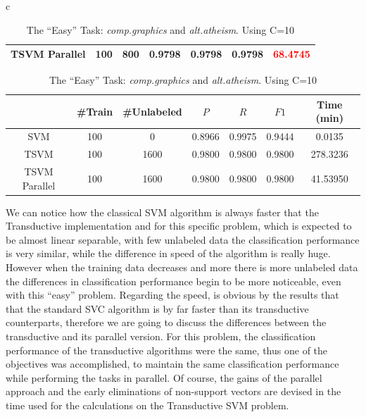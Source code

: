 \begin{table}
\begin{longtable}{c}
\begin{tabular}{|c|c|c|c|c|c||c|}
\hline 
TSVM Parallel & 100 & 800 & 0.9798 & 0.9798 & 0.9798 & \textcolor{red}{68.4745 }\tabularnewline
\hline
\end{tabular}\tabularnewline
\tabularnewline
\begin{tabular}{|c|c|c|c|c|c||c|}
\hline 
 & \#Train & \#Unlabeled & $P$  & $R$  & $F1$  & Time (min)\tabularnewline
\hline
\hline 
SVM & 100 & 0 & 0.8966 & 0.9975 & 0.9444 & 0.0135\tabularnewline
\hline 
TSVM & 100 & 1600 & 0.9800 & 0.9800 & 0.9800 & 278.3236%

{}\tabularnewline
\hline 
TSVM Parallel & 100 & 1600 & 0.9800 & 0.9800 & 0.9800 & 41.53950\tabularnewline
\hline
\end{tabular}\tabularnewline
\end{longtable}

\caption{The {}``Easy'' Task:\emph{ comp.graphics} and \emph{alt.atheism}.
Using C=10 \label{tab:Easy-Task:comp.graphics-and} }

\end{table}

We can notice how the classical SVM algorithm is always faster that
the Transductive implementation and for this specific problem, which
is expected to be almost linear separable, with few unlabeled data
the classification performance is very similar, while the difference
in speed of the algorithm is really huge. However when the training
data decreases and more there is more unlabeled data the differences
in classification performance begin to be more noticeable, even with
this {}``easy'' problem. Regarding the speed, is obvious by the
results that that the standard SVC algorithm is by far faster than
its transductive counterparts, therefore we are going to discuss the
differences between the transductive and its parallel version. For
this problem, the classification performance of the transductive algorithms
were the same, thus one of the objectives was accomplished, to maintain
the same classification performance while performing the tasks in
parallel. Of course, the gains of the parallel approach and the early
eliminations of non-support vectors are devised in the time used for
the calculations on the Transductive SVM problem.

